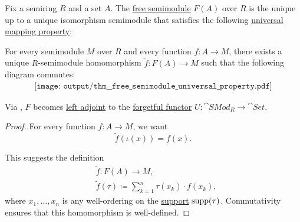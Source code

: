 \begin{proposition}\label{thm:free_semimodule_universal_property}
  Fix a semiring \( R \) and a set \( A \). The \hyperref[def:free_semimodule]{free semimodule} \( F(A) \) over \( R \) is the unique up to a unique isomorphism semimodule that satisfies the following \hyperref[rem:universal_mapping_property]{universal mapping property}:
  \begin{displayquote}
    For every semimodule \( M \) over \( R \) and every function \( f: A \to M \), there exists a unique \( R \)-semimodule homomorphism \( \widetilde{f}: F(A) \to M \) such that the following diagram commutes:
    \begin{equation}\label{eq:thm:free_semimodule_universal_property/diagram}
      \begin{aligned}
        \texttt{[image: output/thm\_\_free\_semimodule\_universal\_property.pdf]}
      \end{aligned}
    \end{equation}
  \end{displayquote}

  Via , \( F \) becomes \hyperref[def:category_adjunction]{left adjoint} to the \hyperref[def:concrete_category]{forgetful functor} \( U: \cat{SMod}_R \to \cat{Set} \).
\end{proposition}
\begin{proof}
  For every function \( f: A \to M \), we want
  \begin{equation*}
    \widetilde{f}(\iota(x)) = f(x).
  \end{equation*}

  This suggests the definition
  \begin{equation*}
    \begin{aligned}
      &\widetilde{f}: F(A) \to M, \\
      &\widetilde{f}(\tau) \coloneqq \sum_{k=1}^n \tau(x_k) \cdot f(x_k),
    \end{aligned}
  \end{equation*}
  where \( x_1, \ldots, x_n \) is any well-ordering on the \hyperref[def:function_support]{support} \( \operatorname{supp}(\tau) \). Commutativity ensures that this homomorphism is well-defined.
\end{proof}

